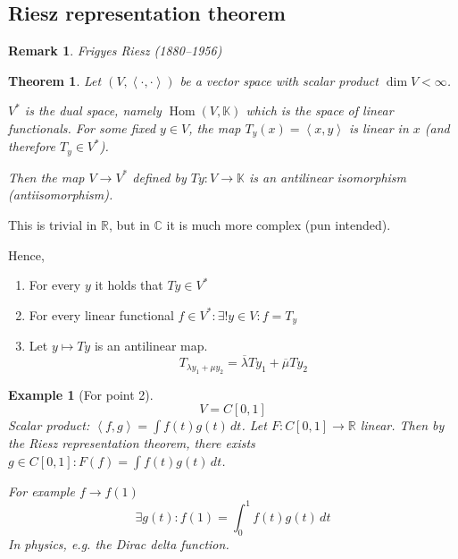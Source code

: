 \documentclass{article}
\newtheorem{theorem}{Theorem}  \numberwithin{theorem}{section}
\newtheorem{example}{Example}  \numberwithin{example}{section}
\newtheorem{remark}{Remark}  \numberwithin{remark}{section}
\newcommand{\ip}[2]{\left\langle#1,#2\right\rangle} %
\begin{document}
\subsection{Riesz representation theorem}

\begin{remark}
  Frigyes Riesz (1880--1956)
\end{remark}

\begin{theorem} %
  Let $(V, \ip{\cdot}{\cdot})$ be a vector space with scalar product $\dim{V} < \infty$.

  $V^*$ is the dual space, namely $\operatorname{Hom}(V, \mathbb K)$ which is the space of linear functionals.
  For some fixed $y \in V$, the map $T_y(x) = \ip{x}{y}$ is linear in $x$ (and therefore $T_y \in V^*$).

  Then the map $V \to V^*$ defined by $Ty: V \to \mathbb K$ is an antilinear isomorphism (antiisomorphism).
\end{theorem}

This is trivial in $\mathbb R$, but in $\mathbb C$ it is much more complex (pun intended).

Hence,
\begin{enumerate}
  \item For every $y$ it holds that $Ty \in V^*$
  \item For every linear functional $f \in V^*: \exists! y \in V: f = T_y$
  \item Let $y \mapsto Ty$ is an antilinear map.
    \[ T_{\lambda y_1 + \mu y_2} = \overline{\lambda} Ty_1 + \overline{\mu} Ty_2 \]
\end{enumerate}

\begin{example}[For point 2]
  \[ V = C[0,1] \]
  Scalar product: $\ip fg = \int f(t) g(t) \, dt$.
  Let $F: C[0,1] \to \mathbb R$ linear.
  Then by the Riesz representation theorem,
  there exists $g \in C[0,1]: F(f) = \int f(t) g(t) \, dt$.

  For example $f \to f(1)$
  \[ \exists g(t): f(1) = \int_0^1 f(t) g(t) \, dt \]
  In physics, e.g. the Dirac delta function.
\end{example}
\end{document}
